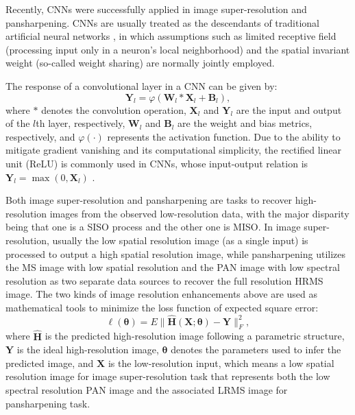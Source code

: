 \documentclass[journal]{IEEEtran}
\begin{document}
Recently, CNNs were successfully applied in image super-resolution and pansharpening. CNNs are usually treated as the descendants of traditional artificial neural networks \cite{CNN:Fukushima1988,CNN:Lecun1989,CNN:Lecun1998}, in which assumptions such as limited receptive field (processing input only in a neuron's local neighborhood) and the spatial invariant weight (so-called weight sharing) are normally jointly employed.

The response of a convolutional layer in a CNN can be given by:
\begin{equation}
   \label{eq:convolution layer} \mathbf{Y}_{l} =  \varphi (\mathbf{W}_{l}*\mathbf{X}_{l} + \mathbf{B}_{l}),
\end{equation}
where $*$ denotes the convolution operation, $\mathbf{X}_l$ and $\mathbf{Y}_l$ are the input and output of the $l$th layer, respectively, $\mathbf{W}_l$ and $\mathbf{B}_l$ are the weight and bias metrics, respectively, and $\varphi(\cdot)$ represents the activation function.
Due to the ability to mitigate gradient vanishing and its computational simplicity, the rectified linear unit (ReLU) \cite{Nair2010Rectified} is commonly used in CNNs, whose input-output relation is $\mathbf{Y}_l=\max(0,\mathbf{X}_l)$ \cite{CNN-Hyperspectral:Hu2015,SuperRes-CNN:Dong2016,CNN-Hyperspectral:Chen2016,CNN-Multiscale:Jia2017}.

Both image super-resolution and pansharpening are tasks to recover high-resolution images from the observed low-resolution data, with the major disparity being that one is a SISO process and the other one is MISO. In image super-resolution, usually the low spatial resolution image (as a single input) is processed to output a high spatial resolution image, while pansharpening utilizes the MS image with low spatial resolution and the PAN image with low spectral resolution as two separate data sources to recover the full resolution HRMS image. The two kinds of image resolution enhancements above are used as mathematical tools to minimize the loss function of expected square error:
\begin{equation}
\label{eq:losssr}
\ell(\pmb{\theta}) =  E\|\widehat{{\mathbf{H}}}(\mathbf{X};\pmb{\theta}) - \mathbf{Y}\|^2_F,
\end{equation}
where $\widehat{\mathbf{H}}$ is the predicted high-resolution image following a parametric structure, $\mathbf{Y}$ is the ideal high-resolution image, $\pmb{\theta}$ denotes the parameters used to infer the predicted image, and $\mathbf{X}$ is the low-resolution input, which means a low spatial resolution image for image super-resolution task that represents both the low spectral resolution PAN image and the associated LRMS image for pansharpening task.
\end{document}
